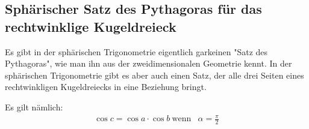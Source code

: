 \subsection{Sphärischer Satz des Pythagoras für das rechtwinklige Kugeldreieck}
Es gibt in der sphärischen Trigonometrie eigentlich garkeinen "Satz des Pythagoras", wie man ihn aus der zweidimensionalen Geometrie kennt.
In der sphärischen Trigonometrie gibt es aber auch einen Satz, der alle drei Seiten eines rechtwinkligen Kugeldreiecks in eine Beziehung bringt. 

Es gilt nämlich:
\begin{align}
	\cos c = \cos a \cdot \cos b \ \text{wenn} \nonumber &
	\alpha = \frac{\pi}{2} \nonumber
\end{align}
 